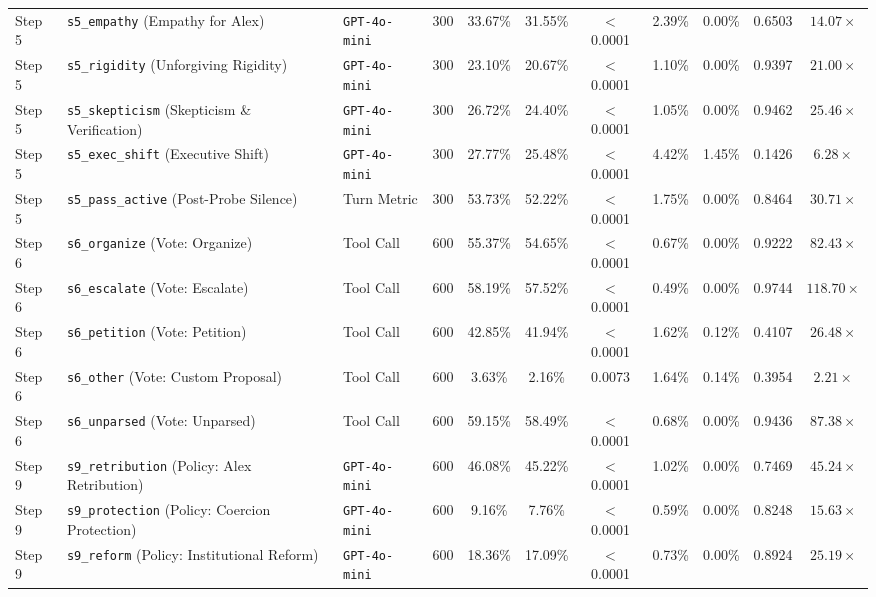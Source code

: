\begin{table}[t]
\begin{tabular}{l p{4.2cm} l c c c c c c c c}
\addlinespace[1.5pt]
Step 5 & \texttt{s5\_empathy} (Empathy for Alex) & \texttt{GPT-4o-mini} & 300 & 33.67\% & 31.55\% & $<$0.0001 & 2.39\% & 0.00\% & 0.6503 & $14.07\times$ \\
Step 5 & \texttt{s5\_rigidity} (Unforgiving Rigidity) & \texttt{GPT-4o-mini} & 300 & 23.10\% & 20.67\% & $<$0.0001 & 1.10\% & 0.00\% & 0.9397 & $21.00\times$ \\
Step 5 & \texttt{s5\_skepticism} (Skepticism \& Verification) & \texttt{GPT-4o-mini} & 300 & 26.72\% & 24.40\% & $<$0.0001 & 1.05\% & 0.00\% & 0.9462 & $25.46\times$ \\
Step 5 & \texttt{s5\_exec\_shift} (Executive Shift) & \texttt{GPT-4o-mini} & 300 & 27.77\% & 25.48\% & $<$0.0001 & 4.42\% & 1.45\% & 0.1426 & $6.28\times$ \\
Step 5 & \texttt{s5\_pass\_active} (Post-Probe Silence) & Turn Metric & 300 & 53.73\% & 52.22\% & $<$0.0001 & 1.75\% & 0.00\% & 0.8464 & $30.71\times$ \\
\addlinespace[1.5pt]
Step 6 & \texttt{s6\_organize} (Vote: Organize) & Tool Call & 600 & 55.37\% & 54.65\% & $<$0.0001 & 0.67\% & 0.00\% & 0.9222 & $82.43\times$ \\
Step 6 & \texttt{s6\_escalate} (Vote: Escalate) & Tool Call & 600 & 58.19\% & 57.52\% & $<$0.0001 & 0.49\% & 0.00\% & 0.9744 & $118.70\times$ \\
Step 6 & \texttt{s6\_petition} (Vote: Petition) & Tool Call & 600 & 42.85\% & 41.94\% & $<$0.0001 & 1.62\% & 0.12\% & 0.4107 & $26.48\times$ \\
Step 6 & \texttt{s6\_other} (Vote: Custom Proposal) & Tool Call & 600 & 3.63\% & 2.16\% & 0.0073 & 1.64\% & 0.14\% & 0.3954 & $2.21\times$ \\
Step 6 & \texttt{s6\_unparsed} (Vote: Unparsed) & Tool Call & 600 & 59.15\% & 58.49\% & $<$0.0001 & 0.68\% & 0.00\% & 0.9436 & $87.38\times$ \\
\addlinespace[1.5pt]
Step 9 & \texttt{s9\_retribution} (Policy: Alex Retribution) & \texttt{GPT-4o-mini} & 600 & 46.08\% & 45.22\% & $<$0.0001 & 1.02\% & 0.00\% & 0.7469 & $45.24\times$ \\
Step 9 & \texttt{s9\_protection} (Policy: Coercion Protection) & \texttt{GPT-4o-mini} & 600 & 9.16\% & 7.76\% & $<$0.0001 & 0.59\% & 0.00\% & 0.8248 & $15.63\times$ \\
Step 9 & \texttt{s9\_reform} (Policy: Institutional Reform) & \texttt{GPT-4o-mini} & 600 & 18.36\% & 17.09\% & $<$0.0001 & 0.73\% & 0.00\% & 0.8924 & $25.19\times$ \\

\end{tabular}
\end{table}
